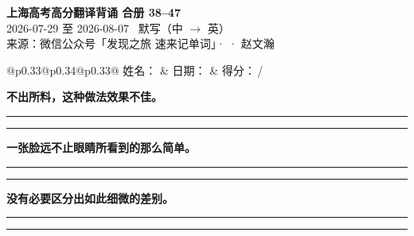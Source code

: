 \documentclass[11pt,a4paper]{article}
\newcommand{\num}[1]{\makebox[1.9em][r]{#1.}\hspace{0.3em}}
\newcommand{\wline}{\noindent\rule{\linewidth}{0.4pt}}
\begin{document}
\pagestyle{plain}
\begin{center}
{\LARGE\bfseries 上海高考高分翻译背诵 \quad 合册 38–47}\\[0.25em]
{\large 2026-07-29 至 2026-08-07 \quad\ 默写（中 $\to$ 英）}\\[0.35em]
{\footnotesize 来源：微信公众号「发现之旅 速来记单词」·  · 赵文瀚}
\end{center}

\vspace{0.4em}
\noindent\begin{tabular}{@{}p{0.33\textwidth}@{}p{0.34\textwidth}@{}p{0.33\textwidth}@{}}
姓名：\underline{\hspace{2.0cm}} & 日期：\underline{\hspace{2.0cm}} & 得分：\underline{\hspace{1.4cm}}\,/ \\
\end{tabular}

\vspace{0.5em}

\vspace{0.8em}
\vspace{0.35em}\vspace{0.15em}

\begin{minipage}{\linewidth}

\num{1}\textbf{不出所料，这种做法效果不佳。}

\vspace{0.3em}

\wline\vspace{0.3em}
\wline

\end{minipage}

\begin{minipage}{\linewidth}

\num{2}\textbf{一张脸远不止眼睛所看到的那么简单。}

\vspace{0.3em}

\wline\vspace{0.3em}
\wline

\end{minipage}

\begin{minipage}{\linewidth}

\num{3}\textbf{没有必要区分出如此细微的差别。}

\vspace{0.3em}

\wline\vspace{0.3em}
\wline

\end{minipage}
\end{document}
